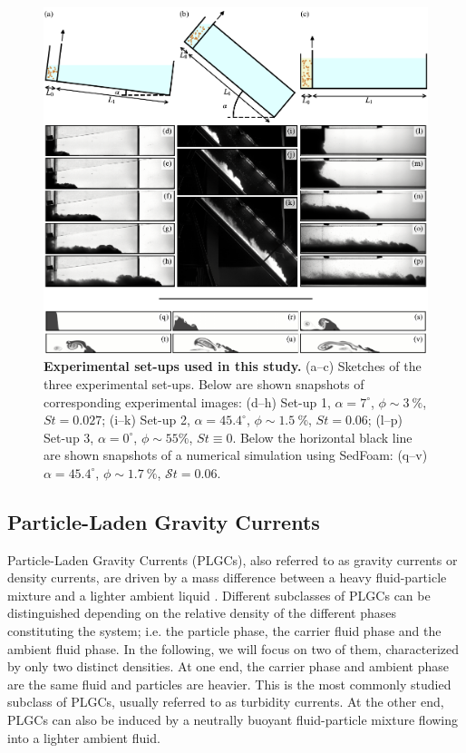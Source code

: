 \documentclass[12pt]{article}
\begin{document}
\begin{figure}[ht!]
	\centering
	\includegraphics{figure1.pdf}
	\caption{\textbf{Experimental set-ups used in this study.} (a--c) Sketches of the three experimental set-ups. Below are shown snapshots of corresponding experimental images: (d--h) Set-up 1, $\alpha = 7^\circ$, $\phi \sim 3~\%$, ${S}t=0.027$; (i--k) Set-up 2, $\alpha = 45.4^\circ$, $\phi \sim 1.5~\%$, ${S}t=0.06 $; (l--p) Set-up 3, $\alpha = 0^\circ$, $\phi \sim 55\%$, ${S}t \equiv 0$. Below the horizontal black line are shown snapshots of a numerical simulation using SedFoam: (q--v) $\alpha = 45.4^\circ$, $\phi \sim 1.7~\%$, $\mathcal{S}t=0.06$.}
	\label{fig:fig1}
\end{figure}


\subsection{Particle-Laden Gravity Currents}
\label{sec:intro_PLGC}

Particle-Laden Gravity Currents (PLGCs), also referred to as gravity currents or density currents, are driven by a mass difference between a heavy fluid-particle mixture and a lighter ambient liquid \citep[e.g.][]{Hopfinger1983, Middleton1993,Kneller2000, Meiburg2010,wells2021}. Different subclasses of PLGCs can be distinguished depending on the relative density of the different phases constituting the system; i.e. the particle phase, the carrier fluid phase and the ambient fluid phase. In the following, we will focus on two of them, characterized by only two distinct densities. At one end, the carrier phase and ambient phase are the same fluid and particles are heavier. This is the most commonly studied subclass of PLGCs, usually referred to as turbidity currents. At the other end, PLGCs can also be induced by a neutrally buoyant fluid-particle mixture flowing into a lighter ambient fluid.
\end{document}
